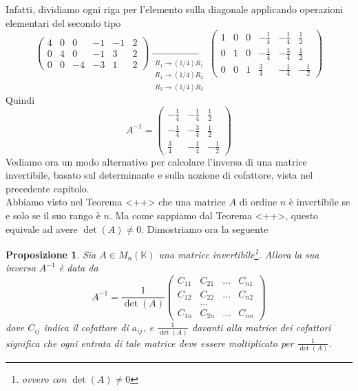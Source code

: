 \documentclass{book}
\newtheorem{proposizione}{Proposizione}
\begin{document}
Infatti, dividiamo ogni riga per l'elemento sulla diagonale applicando operazioni elementari del secondo tipo
\begin{equation*}
     \left(
  \begin{array}{ccc|ccc}
     4 & 0 & 0 &-1 &-1&2\\
     0 & 4 &0 & -1&3&2\\
     0 & 0 &-4&-3&1&2
  \end{array}\right)
   \underset{
  \begin{matrix}
    R_1\to (1/4)R_1\\
    R_1\to (1/4)R_2\\
    R_3\to (1/4)R_3
  \end{matrix}}{\to}
\left(
  \begin{array}{ccc|ccc}
    1&0&0&-\frac{1}{4}&-\frac{1}{4}&\frac{1}{2}\\
    0&1&0&-\frac{1}{4}&-\frac{3}{4}&\frac{1}{2}\\
    0 & 0 &1 &\frac{3}{4}&-\frac{1}{4}&-\frac{1}{2}
  \end{array}\right)
\end{equation*}
Quindi
\begin{equation*}
  A^{-1}=
  \begin{pmatrix}
    -\frac{1}{4}&-\frac{1}{4}&\frac{1}{2}\\
    -\frac{1}{4}&-\frac{3}{4}&\frac{1}{2}\\
    \frac{3}{4}&-\frac{1}{4}&-\frac{1}{2}
  \end{pmatrix}
\end{equation*}
Vediamo ora un modo alternativo per calcolare l'inversa di una matrice invertibile, basato sul determinante e
sulla nozione di cofattore, vista nel precedente capitolo.\\
Abbiamo visto nel Teorema <++> che una matrice $A$ di ordine $n$ è invertibile se e solo se il suo rango è $n$.
Ma come sappiamo dal Teorema <++>, questo equivale ad avere $\det(A)\neq 0$. Dimostriamo ora la seguente
\begin{proposizione}
  Sia $A\in M_n(\mathds{K})$ una matrice invertibile\footnote{ovvero con $\det(A)\neq 0$}. Allora la sua inversa
  $A^{-1}$ è data da
  \begin{equation}
    \label{eq:4.35}
    A^{-1}=\frac{1}{\det (A)}
    \begin{pmatrix}
      C_{11} &C_{21}&\dots & C_{n1}\\
      C_{12} &C_{22}&\dots & C_{n2}\\
      & \dots\\
      C_{1n} & C_{2n} &\dots & C_{nn}
    \end{pmatrix}
  \end{equation}
  dove $C_{ij}$ indica il cofattore di $a_{ij}$, e $\frac{1}{\det(A)}$ davanti alla matrice dei cofattori
  significa che ogni entrata di tale matrice deve essere moltiplicato per $\frac{1}{\det (A)}$.
\end{proposizione}
\end{document}
